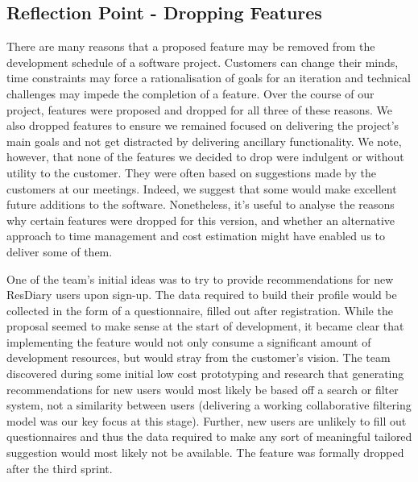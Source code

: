 \documentclass{l3proj}
\begin{document}
\subsection{Reflection Point - Dropping Features}
\label{sec:droppingreflection}
%
%
%

There are many reasons that a proposed feature may be removed from the development schedule of a software project. Customers can change their minds, time constraints may force a rationalisation of goals for an iteration and technical challenges may impede the completion of a feature. Over the course of our project, features were proposed and dropped for all three of these reasons. We also dropped features to ensure we remained focused on delivering the project's main goals and not get distracted by delivering ancillary functionality. We note, however, that none of the features we decided to drop were indulgent or without utility to the customer. They were often based on suggestions made by the customers at our meetings. Indeed, we suggest that some would make excellent future additions to the software. Nonetheless, it's useful to analyse the reasons why certain features were dropped for this version, and whether an alternative approach to time management and cost estimation might have enabled us to deliver some of them.

One of the team's initial ideas was to try to provide recommendations for new ResDiary users upon sign-up. The data required to build their profile would be collected in the form of a questionnaire, filled out after registration. While the proposal seemed to make sense at the start of development, it became clear that implementing the feature would not only consume a significant amount of development resources, but would stray from the customer's vision. The team discovered during some initial low cost prototyping and research that generating recommendations for new users would most likely be based off a search or filter system, not a similarity between users (delivering a working collaborative filtering model was our key focus at this stage). Further, new users are unlikely to fill out questionnaires and thus the data required to make any sort of meaningful tailored suggestion would most likely not be available. The feature was formally dropped after the third sprint.
\end{document}
